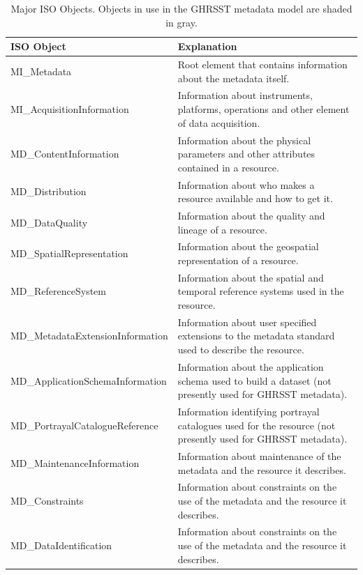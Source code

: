\begin{longtable}{|p{}|p{}|}
    \caption{Major ISO Objects. Objects in use in the GHRSST metadata model are shaded in
gray.}
    \label{tab:table-major_iso_objects} \\
    \hline \endhead \hline \endfoot
    \textbf{ISO Object} & \textbf{Explanation} \\ \hline
    \rowcolor{lightgray} MI\_Metadata & Root element that contains information about the metadata itself. \\ \hline 
    \rowcolor{lightgray} MI\_AcquisitionInformation & Information about instruments, platforms, operations and other element of data acquisition. \\ \hline 
    \rowcolor{lightgray} MD\_ContentInformation & Information about the physical parameters and other attributes contained in a resource. \\ \hline
    \rowcolor{lightgray} MD\_Distribution & Information about who makes a resource available and how to get it. \\ \hline 
    \rowcolor{lightgray} MD\_DataQuality & Information about the quality and lineage of a resource. \\ \hline 
    \rowcolor{lightgray} MD\_SpatialRepresentation & Information about the geospatial representation of a resource. \\ \hline
    \rowcolor{lightgray} MD\_ReferenceSystem & Information about the spatial and temporal reference systems used in the resource. \\ \hline
    MD\_MetadataExtensionInformation  & Information about user specified extensions to the metadata standard used to describe the resource. \\ \hline
    MD\_ApplicationSchemaInformation & Information about the application schema used to build a dataset (not presently used for GHRSST metadata). \\ \hline 
    MD\_PortrayalCatalogueReference & Information identifying portrayal catalogues used for the resource (not presently used for GHRSST metadata). \\ \hline
    MD\_MaintenanceInformation & Information about maintenance of the metadata and the resource it describes. \\ \hline
    \rowcolor{lightgray}MD\_Constraints & Information about constraints on the use of the metadata and the resource it describes. \\ \hline
    \rowcolor{lightgray}MD\_DataIdentification & Information about constraints on the use of the metadata and the resource it describes. \\ \hline

\end{longtable}
